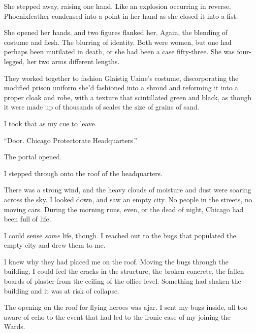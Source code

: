 She stepped away, raising one hand.  Like an explosion occurring in reverse, Phoenixfeather condensed into a point in her hand as she closed it into a fist.



She opened her hands, and two figures flanked her.  Again, the blending of costume and flesh.  The blurring of identity.  Both were women, but one had perhaps been mutilated in death, or she had been a case fifty-three.  She was four-legged, her two arms different lengths.



They worked together to fashion Glaistig Uaine's costume, discorporating the modified prison uniform she'd fashioned into a shroud and reforming it into a proper cloak and robe, with a texture that scintillated green and black, as though it were made up of thousands of scales the size of grains of sand.



I took that as my cue to leave.



``Door.  Chicago Protectorate Headquarters.''



The portal opened.



I stepped through onto the roof of the headquarters.



There was a strong wind, and the heavy clouds of moisture and dust were soaring across the sky.  I looked down, and saw an empty city.  No people in the streets, no moving cars.  During the morning runs, even, or the dead of night, Chicago had been full of life.



I could sense \emph{some} life, though.  I reached out to the bugs that populated the empty city and drew them to me.



I knew why they had placed me on the roof.  Moving the bugs through the building, I could feel the cracks in the structure, the broken concrete, the fallen boards of plaster from the ceiling of the office level.  Something had shaken the building and it was at risk of collapse.



The opening on the roof for flying heroes was ajar.  I sent my bugs inside, all too aware of echo to the event that had led to the ironic case of my joining the Wards.



